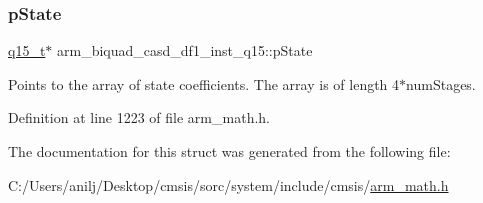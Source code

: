 \mbox{\label{structarm__biquad__casd__df1__inst__q15_a5481104ef2f8f81360b80b47d69ae932}} 
\subsubsection{\texorpdfstring{p\+State}{pState}}
{\footnotesize\ttfamily \hyperlink{arm__math_8h_ab5a8fb21a5b3b983d5f54f31614052ea}{q15\+\_\+t}$\ast$ arm\+\_\+biquad\+\_\+casd\+\_\+df1\+\_\+inst\+\_\+q15\+::p\+State}

Points to the array of state coefficients. The array is of length 4$\ast$num\+Stages. 

Definition at line 1223 of file arm\+\_\+math.\+h.



The documentation for this struct was generated from the following file\+:\begin{DoxyCompactItemize}
\item 
C\+:/\+Users/anilj/\+Desktop/cmsis/sorc/system/include/cmsis/\hyperlink{arm__math_8h}{arm\+\_\+math.\+h}\end{DoxyCompactItemize}
